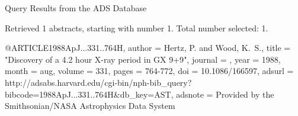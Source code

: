 Query Results from the ADS Database


Retrieved 1 abstracts, starting with number 1.  Total number selected: 1.

@ARTICLE{1988ApJ...331..764H,
   author = {{Hertz}, P. and {Wood}, K.~S.},
    title = "{Discovery of a 4.2 hour X-ray period in GX 9+9}",
  journal = {\apj},
     year = 1988,
    month = aug,
   volume = 331,
    pages = {764-772},
      doi = {10.1086/166597},
   adsurl = {http://adsabs.harvard.edu/cgi-bin/nph-bib_query?bibcode=1988ApJ...331..764H&db_key=AST},
  adsnote = {Provided by the Smithsonian/NASA Astrophysics Data System}
}


